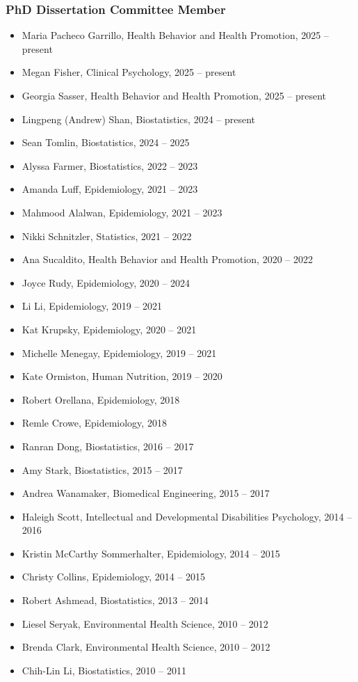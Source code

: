 \documentclass[
  english,
  letterpaper,
  DIV=11,
  numbers=noendperiod]{scrartcl}
\providecommand{\tightlist}{%
  \setlength{\itemsep}{0pt}\setlength{\parskip}{0pt}}
\begin{document}
\subsubsection{PhD Dissertation Committee
Member}\label{phd-dissertation-committee-member}

\begin{itemize}
\tightlist
\item
  Maria Pacheco Garrillo, Health Behavior and Health Promotion, 2025 --
  present
\item
  Megan Fisher, Clinical Psychology, 2025 -- present
\item
  Georgia Sasser, Health Behavior and Health Promotion, 2025 -- present
\item
  Lingpeng (Andrew) Shan, Biostatistics, 2024 -- present
\item
  Sean Tomlin, Biostatistics, 2024 -- 2025
\item
  Alyssa Farmer, Biostatistics, 2022 -- 2023
\item
  Amanda Luff, Epidemiology, 2021 -- 2023
\item
  Mahmood Alalwan, Epidemiology, 2021 -- 2023
\item
  Nikki Schnitzler, Statistics, 2021 -- 2022
\item
  Ana Sucaldito, Health Behavior and Health Promotion, 2020 -- 2022
\item
  Joyce Rudy, Epidemiology, 2020 -- 2024
\item
  Li Li, Epidemiology, 2019 -- 2021
\item
  Kat Krupsky, Epidemiology, 2020 -- 2021
\item
  Michelle Menegay, Epidemiology, 2019 -- 2021
\item
  Kate Ormiston, Human Nutrition, 2019 -- 2020
\item
  Robert Orellana, Epidemiology, 2018
\item
  Remle Crowe, Epidemiology, 2018
\item
  Ranran Dong, Biostatistics, 2016 -- 2017
\item
  Amy Stark, Biostatistics, 2015 -- 2017
\item
  Andrea Wanamaker, Biomedical Engineering, 2015 -- 2017
\item
  Haleigh Scott, Intellectual and Developmental Disabilities Psychology,
  2014 -- 2016
\item
  Kristin McCarthy Sommerhalter, Epidemiology, 2014 -- 2015
\item
  Christy Collins, Epidemiology, 2014 -- 2015
\item
  Robert Ashmead, Biostatistics, 2013 -- 2014
\item
  Liesel Seryak, Environmental Health Science, 2010 -- 2012
\item
  Brenda Clark, Environmental Health Science, 2010 -- 2012
\item
  Chih-Lin Li, Biostatistics, 2010 -- 2011
\end{itemize}
\end{document}

